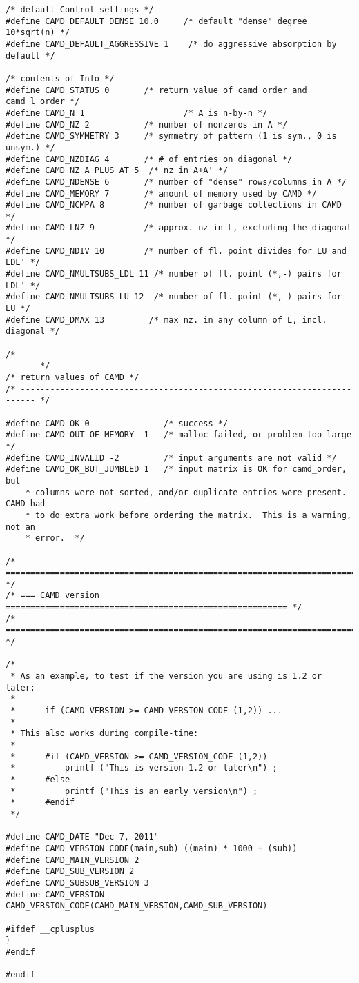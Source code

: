 \documentclass[11pt]{article}
\begin{document}
{\begin{verbatim}
/* default Control settings */
#define CAMD_DEFAULT_DENSE 10.0     /* default "dense" degree 10*sqrt(n) */
#define CAMD_DEFAULT_AGGRESSIVE 1    /* do aggressive absorption by default */

/* contents of Info */
#define CAMD_STATUS 0       /* return value of camd_order and camd_l_order */
#define CAMD_N 1                    /* A is n-by-n */
#define CAMD_NZ 2           /* number of nonzeros in A */ 
#define CAMD_SYMMETRY 3     /* symmetry of pattern (1 is sym., 0 is unsym.) */
#define CAMD_NZDIAG 4       /* # of entries on diagonal */
#define CAMD_NZ_A_PLUS_AT 5  /* nz in A+A' */
#define CAMD_NDENSE 6       /* number of "dense" rows/columns in A */
#define CAMD_MEMORY 7       /* amount of memory used by CAMD */
#define CAMD_NCMPA 8        /* number of garbage collections in CAMD */
#define CAMD_LNZ 9          /* approx. nz in L, excluding the diagonal */
#define CAMD_NDIV 10        /* number of fl. point divides for LU and LDL' */
#define CAMD_NMULTSUBS_LDL 11 /* number of fl. point (*,-) pairs for LDL' */
#define CAMD_NMULTSUBS_LU 12  /* number of fl. point (*,-) pairs for LU */
#define CAMD_DMAX 13         /* max nz. in any column of L, incl. diagonal */

/* ------------------------------------------------------------------------- */
/* return values of CAMD */
/* ------------------------------------------------------------------------- */

#define CAMD_OK 0               /* success */
#define CAMD_OUT_OF_MEMORY -1   /* malloc failed, or problem too large */
#define CAMD_INVALID -2         /* input arguments are not valid */
#define CAMD_OK_BUT_JUMBLED 1   /* input matrix is OK for camd_order, but
    * columns were not sorted, and/or duplicate entries were present.  CAMD had
    * to do extra work before ordering the matrix.  This is a warning, not an
    * error.  */

/* ========================================================================== */
/* === CAMD version ========================================================= */
/* ========================================================================== */

/*
 * As an example, to test if the version you are using is 1.2 or later:
 *
 *      if (CAMD_VERSION >= CAMD_VERSION_CODE (1,2)) ...
 *
 * This also works during compile-time:
 *
 *      #if (CAMD_VERSION >= CAMD_VERSION_CODE (1,2))
 *          printf ("This is version 1.2 or later\n") ;
 *      #else
 *          printf ("This is an early version\n") ;
 *      #endif
 */

#define CAMD_DATE "Dec 7, 2011"
#define CAMD_VERSION_CODE(main,sub) ((main) * 1000 + (sub))
#define CAMD_MAIN_VERSION 2
#define CAMD_SUB_VERSION 2
#define CAMD_SUBSUB_VERSION 3
#define CAMD_VERSION CAMD_VERSION_CODE(CAMD_MAIN_VERSION,CAMD_SUB_VERSION)

#ifdef __cplusplus
}
#endif

#endif
\end{verbatim}
}

\newpage



\end{document}
